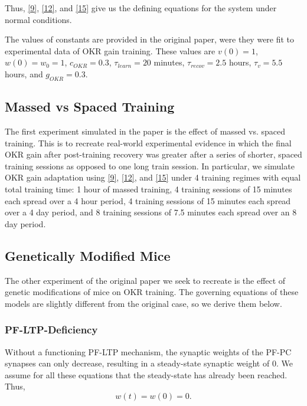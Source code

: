 \documentclass[10pt]{article}
\begin{document}
Thus, \eqref{9}, \eqref{12}, and \eqref{15} give us the defining equations for the system under normal conditions.

The values of constants are provided in the original paper, were they were fit to experimental data of OKR gain training. These values are \(v(0)=1\), \(w(0)=w_0=1\), \(c_{OKR}=0.3\), \(\tau_{learn}=20\) minutes, \(\tau_{recov}=2.5\) hours, \(\tau_{v}=5.5\) hours, and \(g_{OKR}=0.3\).

\subsection{Massed vs Spaced Training}

The first experiment simulated in the paper is the effect of massed vs. spaced training. This is to recreate real-world experimental evidence in which the final OKR gain after post-training recovery was greater after a series of shorter, spaced training sessions as opposed to one long train session. In particular, we simulate OKR gain adaptation using \eqref{9}, \eqref{12}, and \eqref{15} under 4 training regimes with equal total training time: 1 hour of massed training, 4 training sessions of 15 minutes each spread over a 4 hour period, 4 training sessions of 15 minutes each spread over a 4 day period, and 8 training sessions of 7.5 minutes each spread over an 8 day period.

\subsection{Genetically Modified Mice}

The other experiment of the original paper we seek to recreate is the effect of genetic modifications of mice on OKR training. The governing equations of these models are slightly different from the original case, so we derive them below. 

\subsubsection{PF-LTP-Deficiency}

Without a functioning PF-LTP mechanism, the synaptic weights of the PF-PC synapses can only decrease, resulting in a steady-state synaptic weight of 0. We assume for all these equations that the steady-state has already been reached. Thus, \begin{equation}
    \label{16}
    w(t)=w(0)=0.
\end{equation}
\end{document}

